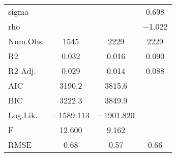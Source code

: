 \documentclass{article}
\begin{document}
\begin{table}
\begin{tabular}[t]{lccc}
sigma &  &  & \num{0.698}\\
rho &  &  & \num{-1.022}\\
\midrule
Num.Obs. & \num{1545} & \num{2229} & \num{2229}\\
R2 & \num{0.032} & \num{0.016} & \num{0.090}\\
R2 Adj. & \num{0.029} & \num{0.014} & \num{0.088}\\
AIC & \num{3190.2} & \num{3815.6} & \\
BIC & \num{3222.3} & \num{3849.9} & \\
Log.Lik. & \num{-1589.113} & \num{-1901.820} & \\
F & \num{12.600} & \num{9.162} & \\
RMSE & \num{0.68} & \num{0.57} & \num{0.66}\\
\bottomrule
\end{tabular}
\end{table}
\end{document}
